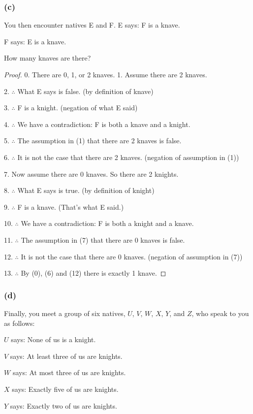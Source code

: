 \documentclass[14pt]{extarticle}
\begin{document}
\subsubsection{(c)} You then encounter natives E and F.
E says: F is a knave.

F says: E is a knave.

How many knaves are there?

\begin{proof} 0. There are 0, 1, or 2 knaves.
1. Assume there are 2 knaves.

2. $\therefore$ What E says is false. (by definition of knave)

3. $\therefore$ F is a knight. (negation of what E said)

4. $\therefore$ We have a contradiction: F is both a knave and a knight.

5. $\therefore$ The assumption in (1) that there are 2 knaves is false.

6. $\therefore$ It is not the case that there are 2 knaves. (negation of
assumption in (1))

7. Now assume there are 0 knaves. So there are 2 knights.

8. $\therefore$ What E says is true. (by definition of knight)

9. $\therefore$ F is a knave. (That's what E said.)

10. $\therefore$ We have a contradiction: F is both a knight and a knave.

11. $\therefore$ The assumption in (7) that there are 0 knaves is false.

12. $\therefore$ It is not the case that there are 0 knaves. (negation of
assumption in (7))

13. $\therefore$ By (0), (6) and (12) there is exactly 1 knave. \end{proof}
\subsubsection{(d)} Finally, you meet a group of six natives, $U$, $V$, $W$,
$X$, $Y$, and $Z$, who speak to you as follows:

$U$ says: None of us is a knight.

$V$ says: At least three of us are knights.

$W$ says: At most three of us are knights.

$X$ says: Exactly five of us are knights.

$Y$ says: Exactly two of us are knights.
\end{document}
